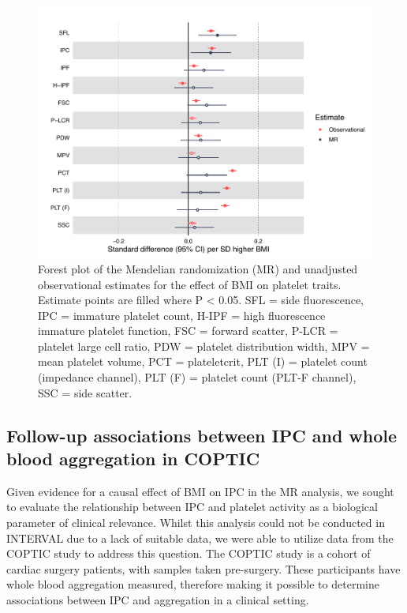 \documentclass[11pt,twoside]{bristolthesis}
\begin{document}
\begin{figure}
\includegraphics{figure/BMI_platelets/BMI_platelet_forestplot} \caption[Forest plot of the Mendelian randomization and unadjusted observational estimates for the effect of BMI on platelet traits.]{Forest plot of the Mendelian randomization (MR) and unadjusted observational estimates for the effect of BMI on platelet traits. Estimate points are filled where P < 0.05. SFL = side fluorescence, IPC = immature platelet count, H-IPF = high fluorescence immature platelet function, FSC = forward scatter, P-LCR = platelet large cell ratio, PDW = platelet distribution width, MPV = mean platelet volume, PCT = plateletcrit, PLT (I) = platelet count (impedance channel), PLT (F) = platelet count (PLT-F channel), SSC = side scatter.}\label{fig:BMI-platelet-forest}
\end{figure}
\hypertarget{follow-up-associations-between-ipc-and-whole-blood-aggregation-in-coptic}{%
\subsection{Follow-up associations between IPC and whole blood aggregation in COPTIC}\label{follow-up-associations-between-ipc-and-whole-blood-aggregation-in-coptic}}

Given evidence for a causal effect of BMI on IPC in the MR analysis, we sought to evaluate the relationship between IPC and platelet activity as a biological parameter of clinical relevance. Whilst this analysis could not be conducted in INTERVAL due to a lack of suitable data, we were able to utilize data from the COPTIC study to address this question. The COPTIC study is a cohort of cardiac surgery patients, with samples taken pre-surgery. These participants have whole blood aggregation measured, therefore making it possible to determine associations between IPC and aggregation in a clinical setting.
\end{document}
